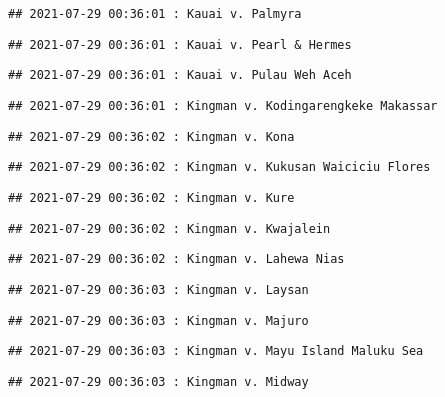 \documentclass[
]{article}
\begin{document}
\begin{verbatim}
## 2021-07-29 00:36:01 : Kauai v. Palmyra
\end{verbatim}

\begin{verbatim}
## 2021-07-29 00:36:01 : Kauai v. Pearl & Hermes
\end{verbatim}

\begin{verbatim}
## 2021-07-29 00:36:01 : Kauai v. Pulau Weh Aceh
\end{verbatim}

\begin{verbatim}
## 2021-07-29 00:36:01 : Kingman v. Kodingarengkeke Makassar
\end{verbatim}

\begin{verbatim}
## 2021-07-29 00:36:02 : Kingman v. Kona
\end{verbatim}

\begin{verbatim}
## 2021-07-29 00:36:02 : Kingman v. Kukusan Waiciciu Flores
\end{verbatim}

\begin{verbatim}
## 2021-07-29 00:36:02 : Kingman v. Kure
\end{verbatim}

\begin{verbatim}
## 2021-07-29 00:36:02 : Kingman v. Kwajalein
\end{verbatim}

\begin{verbatim}
## 2021-07-29 00:36:02 : Kingman v. Lahewa Nias
\end{verbatim}

\begin{verbatim}
## 2021-07-29 00:36:03 : Kingman v. Laysan
\end{verbatim}

\begin{verbatim}
## 2021-07-29 00:36:03 : Kingman v. Majuro
\end{verbatim}

\begin{verbatim}
## 2021-07-29 00:36:03 : Kingman v. Mayu Island Maluku Sea
\end{verbatim}

\begin{verbatim}
## 2021-07-29 00:36:03 : Kingman v. Midway
\end{verbatim}
\end{document}
